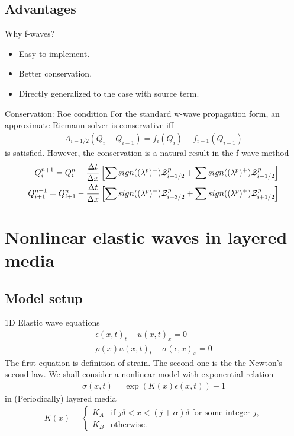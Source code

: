 \documentclass{beamer}
\begin{document}
\subsection{Advantages}
\begin{frame}{Why f-waves?}
\begin{itemize}
\item Easy to implement.
\item Better conservation. 
\item Directly generalized to the case with source term.
\end{itemize}
\end{frame}

\begin{frame}{Conservation: Roe condition}
For the standard w-wave propagation form, an approximate Riemann solver is conservative iff
\begin{align*}
A_{i-1/2}(Q_i-Q_{i-1})=f_{i}(Q_i)-f_{i-1}(Q_{i-1})
\end{align*}
is satisfied. However, the conservation is a natural result in the f-wave method
\begin{align*}
Q_i^{n+1}=Q_i^{n}-\frac{\Delta t}{\Delta x}\left[\sum sign((\lambda^p)^-) {\cal Z}_{i+1/2}^p+\sum sign((\lambda^p)^+) {\cal Z}_{i-1/2}^p\right] \\
Q_{i+1}^{n+1}=Q_{i+1}^{n}-\frac{\Delta t}{\Delta x}\left[\sum sign((\lambda^p)^-) {\cal Z}_{i+3/2}^p+\sum sign((\lambda^p)^+) {\cal Z}_{i+1/2}^p\right]
\end{align*}
\end{frame}

\section{Nonlinear elastic waves in layered media}
\subsection{Model setup}
\begin{frame}{1D Elastic wave equations}
\begin{align*}
\epsilon(x,t)_t-u(x,t)_x=0 \\
\rho(x) u(x,t)_t-\sigma(\epsilon,x)_x=0 
\end{align*}
The first equation is definition of strain. The second one is the the Newton's second law. We shall consider a nonlinear model with exponential relation
\begin{align*}
\sigma(x,t)=\exp(K(x)\epsilon(x,t))-1
\end{align*}
in (Periodically) layered media
\begin{align*}
K(x)=\left\{
\begin{array}{cc}
K_A & \mbox{if }j\delta<x<(j+\alpha)\delta \mbox{ for some integer } j,\\
K_B & \mbox{otherwise.}
\end{array}
\right.
\end{align*}
\end{frame}
\end{document}
